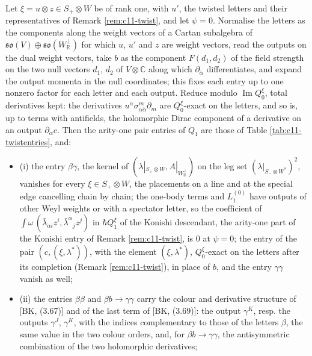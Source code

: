 \begin{theorem}
\label{thm:c11-twistentries}
Let $\xi=u\otimes z\in S_+\otimes W$ be of rank one, with $u'$, the twisted letters and their representatives of Remark \ref{rem:c11-twist}, and let $\psi=0$. Normalise the letters as the components along the weight vectors of a Cartan subalgebra of $\mathfrak{so}(V)\oplus\mathfrak{so}(W_{\mathbb R}^\perp)$ for which $u$, $u'$ and $z$ are weight vectors, read the outputs on the dual weight vectors, take $b$ as the component $F(d_1,d_2)$ of the field strength on the two null vectors $d_1$, $d_2$ of $V\otimes\mathbb C$ along which $\partial_{\dot\alpha}$ differentiates, and expand the output momenta in the null coordinates; this fixes each entry up to one nonzero factor for each letter and each output. Reduce modulo $\operatorname{Im}Q^\xi_0$, total derivatives kept: the derivatives $u^\alpha\sigma^m_{\alpha\dot\alpha}\partial_m$ are $Q^\xi_0$-exact on the letters, and so is, up to terms with antifields, the holomorphic Dirac component of a derivative on an output $\partial_{\dot\alpha}c$. Then the arity-one pair entries of $Q_1$ are those of Table \ref{tab:c11-twistentries}, and:
\begin{itemize}
\item (i) the entry $\beta\gamma$, the kernel of $(\lambda|_{S_+\otimes W},A|_{W_{\mathbb R}^\perp})$ on the leg set $(\lambda|_{S_-\otimes W^*})^2$, vanishes for every $\xi\in S_+\otimes W$, the placements on a line and at the special edge cancelling chain by chain; the one-body terms and $L_1^{(0)}$ have outputs of other Weyl weights or with a spectator letter, so the coefficient of $\int\omega\,(\bar\lambda_{\dot\alpha i}z^i,\bar\lambda^{\dot\alpha}{}_jz^j)$ in $\hbar Q^\xi_1$ of the Konishi descendant, the arity-one part of the Konishi entry of Remark \ref{rem:c11-twist}, is $0$ at $\psi=0$; the entry of the pair $(c,(\xi,\lambda^*))$, with the element $(\xi,\lambda^*)$, $Q^\xi_0$-exact on the letters after its completion (Remark \ref{rem:c11-twist}), in place of $b$, and the entry $\gamma\gamma$ vanish as well;
\item (ii) the entries $\beta\beta$ and $\beta b\to\gamma\gamma$ carry the colour and derivative structure of [BK, (3.67)] and of the last term of [BK, (3.69)]: the output $\gamma^K$, resp. the outputs $\gamma^J$, $\gamma^K$, with the indices complementary to those of the letters $\beta$, the same value in the two colour orders, and, for $\beta b\to\gamma\gamma$, the antisymmetric combination of the two holomorphic derivatives;

\end{itemize}
\end{theorem}

